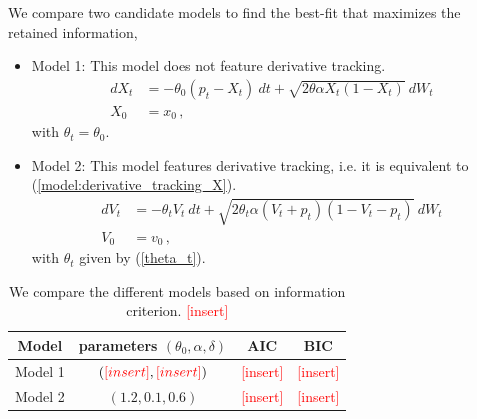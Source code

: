 \documentclass[11pt]{article}
\theoremstyle{definition}
\newcommand{\add}{\textcolor{red}{[insert]}}
\begin{document}
We compare two candidate models to find the best-fit that maximizes the retained information,
\begin{itemize}
  \item Model 1: This model does not feature derivative tracking.
  \begin{align}
  dX_t &=  - \theta_0 (p_t-X_t) \  dt + \sqrt{2 \theta \alpha X_t (1-X_t)} \  dW_t   \nonumber \\ %
  X_0 & = x_0 \,, \label{M0}
 \end{align}
  with $\theta_t= \theta_0 $.

%  

  \item Model 2: This model features derivative tracking, i.e. it is equivalent to (\ref{model:derivative_tracking_X}).
  \begin{align}
  dV_t &=  - \theta_t V_t \  dt + \sqrt{2 \theta_t \alpha (V_t +p_t ) (1-V_t-p_t)} \  dW_t   \nonumber \\ %
  V_0 & = v_0 \,, \label{M2}
  \end{align}
  with $\theta_t$ given by (\ref{theta_t}).
\end{itemize}

\begin{table}[H]
\centering
\begin{tabular}{cccc}
\toprule
Model   &  parameters $(\theta_0, \alpha,\delta)$   & AIC & BIC \\ \midrule
Model 1 &  $(\add,\add) $    &  \add   &  \add   \\
Model 2 &   $(1.2,0.1,0.6)$   &  \add   &   \add    \\ 
\bottomrule
\end{tabular}
\caption{We compare the different models based on information criterion. \add }
\label{tab:model_comparison}
\end{table}
\end{document}
